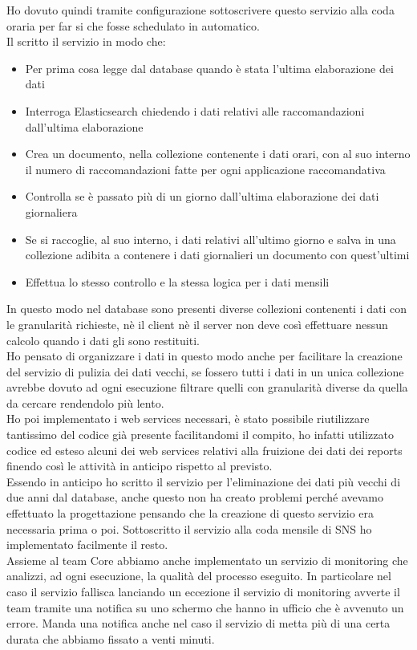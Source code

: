 \documentclass[a4paper, 12pt, twoside, openright]{book}
\begin{document}
Ho dovuto quindi tramite configurazione sottoscrivere questo servizio alla coda oraria per far si che fosse schedulato in automatico.\\
Il scritto il servizio in modo che:
\begin{itemize}
	\item Per prima cosa legge dal database quando è stata l'ultima elaborazione dei dati
	\item Interroga Elasticsearch chiedendo i dati relativi alle raccomandazioni dall'ultima elaborazione 
	\item Crea un documento, nella collezione contenente i dati orari, con al suo interno il numero di raccomandazioni fatte per ogni applicazione raccomandativa
	\item Controlla se è passato più di un giorno dall'ultima elaborazione dei dati giornaliera
	\item Se si raccoglie, al suo interno, i dati relativi all'ultimo giorno e salva in una collezione adibita a contenere i dati giornalieri un documento con quest'ultimi
	\item Effettua lo stesso controllo e la stessa logica per i dati mensili
\end{itemize}
In questo modo nel database sono presenti diverse collezioni contenenti i dati con le granularità richieste, nè il client nè il server non deve così effettuare nessun calcolo quando i dati gli sono restituiti.\\
Ho pensato di organizzare i dati in questo modo anche per facilitare la creazione del servizio di pulizia dei dati vecchi, se fossero tutti i dati in un unica collezione avrebbe dovuto ad ogni esecuzione filtrare quelli con granularità diverse da quella da cercare rendendolo più lento.\\
Ho poi implementato i web services necessari, è stato possibile riutilizzare tantissimo del codice già presente facilitandomi il compito, ho infatti utilizzato codice ed esteso alcuni dei web services relativi alla fruizione dei dati dei reports finendo così le attività in anticipo rispetto al previsto.\\
Essendo in anticipo ho scritto il servizio per l'eliminazione dei dati più vecchi di due anni dal database, anche questo non ha creato problemi perché avevamo effettuato la progettazione pensando che la creazione di questo servizio era necessaria prima o poi. Sottoscritto il servizio alla coda mensile di SNS ho implementato facilmente il resto.\\
Assieme al team Core abbiamo anche implementato un servizio di monitoring che analizzi, ad ogni esecuzione, la qualità del processo eseguito. In particolare nel caso il servizio fallisca lanciando un eccezione il servizio di monitoring avverte il team tramite una notifica su uno schermo che hanno in ufficio che è avvenuto un errore. Manda una notifica anche nel caso il servizio di metta più di una certa durata che abbiamo fissato a venti minuti.\\
\end{document}
